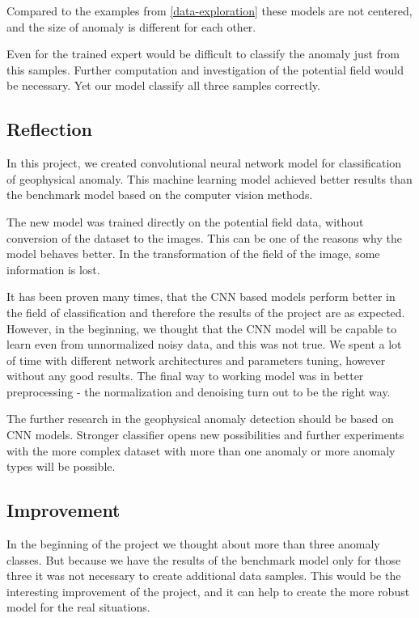 \documentclass{article}
\begin{document}
Compared to the examples from \ref{data-exploration} these models are not centered, and the size of
anomaly is different for each other. 

Even for the trained expert would be difficult to classify the anomaly just from this samples. Further computation and
investigation of the potential field would be necessary. Yet our model classify all three samples correctly.


\subsection{Reflection}\label{reflection}

In this project, we created convolutional neural network model for
classification of geophysical anomaly. This machine learning model
achieved better results than the benchmark model based on the computer
vision methods.

The new model was trained directly on the potential field data, without
conversion of the dataset to the images. This can be one of the reasons
why the model behaves better. In the transformation of the field of the
image, some information is lost.

It has been proven many times, that the CNN based models perform better
in the field of classification and therefore the results of the project
are as expected. However, in the beginning, we thought that the CNN
model will be capable to learn even from unnormalized noisy data, and
this was not true. We spent a lot of time with different network
architectures and parameters tuning, however without any good results.
The final way to working model was in better preprocessing - the
normalization and denoising turn out to be the right way.

The further research in the geophysical anomaly detection should be
based on CNN models. Stronger classifier opens new possibilities and
further experiments with the more complex dataset with more than one
anomaly or more anomaly types will be possible.

\subsection{Improvement}\label{improvement}

In the beginning of the project we thought about more than three anomaly
classes. But because we have the results of the benchmark model only for
those three it was not necessary to create additional data samples. This
would be the interesting improvement of the project, and it can help to
create the more robust model for the real situations.
\end{document}
